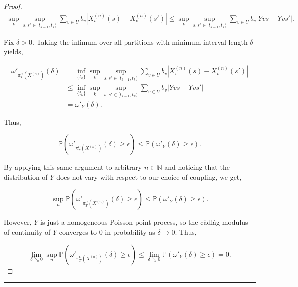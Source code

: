\documentclass[12pt]{article}
\newcommand{\mb}{\mathbb}
\newcommand{\ra}{\rightarrow}
\newcommand{\ep}{\epsilon}
\newcommand{\lin}{\rule{\linewidth}{0.4 pt}}
\newcommand{\pr}{\mb{P}}							%
\renewcommand{\v}{v}							%
\renewcommand{\U}{U}							%
\renewcommand{\b}{b}							%
\newcommand{\T}{T}								%
\renewcommand{\t}{t}							%
\newcommand{\proj}{\pi}							%
\renewcommand{\tt}{s}							%
\newcommand{\ttt}{s'}							%
\newcommand{\X}{X}								%
\newcommand{\vsi}[1]{^{#1}}						%
\newcommand{\cind}[1]{_{#1}}					%
\newcommand{\tp}[1]{(#1)}						%
\newcommand{\tip}[1]{#1}						%
\newcommand{\ts}[1]{_{#1}}						%
\newcommand{\sln}[1]{^{(#1)}}						%
\newcommand{\indx}[1]{_{#1}}					%
\newcommand{\XX}{Y}								%
\renewcommand{\it}{k}							%
\begin{document}
\begin{proof}
\begin{align*}
\sup_\it\sup_{\tt,\ttt \in [\t\indx{\it-1},\t\indx{\it})} \sum_{\v\in \U} \b\cind{\v}|\X\sln{n}\cind{\v}\tp{\tt} - \X\sln{n}\cind{\v}\tp{\ttt}|\leq \sup_\it\sup_{\tt,\ttt \in [\t\indx{\it-1},\t\indx{\it})} \sum_{\v\in \U} \b\cind{\v}|\XX{\v}{\tt} - \XX{\v}{\ttt}|.
\end{align*}

Fix \(\delta > 0\). Taking the infimum over all partitions with minimum interval length \(\delta\) yields,

\begin{align*}
\omega'_{\proj\vsi{\U}\ts{\T}\left(\X\sln{n}\cind{}\tip{}\right)}(\delta) &= \inf_{\{\t\indx{\it}\}}\sup_\it\sup_{\tt,\ttt \in [\t\indx{\it-1},\t\indx{\it})} \sum_{\v\in \U} \b\cind{\v}|\X\sln{n}\cind{\v}\tp{\tt} - \X\sln{n}\cind{\v}\tp{\ttt}|\\
&\leq \inf_{\{\t\indx{\it}\}}\sup_\it\sup_{\tt,\ttt \in [\t\indx{\it-1},\t\indx{\it})} \sum_{\v\in \U} \b\cind{\v}|\XX{\v}{\tt} - \XX{\v}{\ttt}|\\
&= \omega'_{\XX{}{}}(\delta).
\end{align*}

Thus,

\[\pr\left(\omega'_{\proj\vsi{\U}\ts{\T}\left(\X\sln{n}\cind{}\tip{}\right)}(\delta) \geq \ep\right) \leq \pr\left(\omega'_{\XX{}{}}(\delta) \geq \ep\right).\]

By applying this same argument to arbitrary \(n\in \mb{N}\) and noticing that the distribution of \(\XX{}{}\) does not vary with respect to our choice of coupling, we get,

\[\sup_{n}\pr\left(\omega'_{\proj\vsi{\U}\ts{\T}\left(\X\sln{n}\cind{}\tip{}\right)}(\delta)\geq \ep\right) \leq \pr\left(\omega'_{\XX{}{}}(\delta) \geq \ep\right).\]

However, \(\XX{}{}\) is just a homogeneous Poisson point process, so the c\`adl\`ag modulus of continuity of \(\XX{}{}\) converges to 0 in probability as \(\delta \ra 0\). Thus,

\[\lim_{\delta \searrow 0}\sup_{n}\pr\left(\omega'_{\proj\vsi{\U}\ts{\T}\left(\X\sln{n}\cind{}\tip{}\right)}(\delta) \geq \ep\right) \leq \lim_{\delta\searrow 0}\pr\left(\omega'_{\XX{}{}}(\delta)\geq \ep\right) = 0.\]


\end{proof}

\lin
\end{document}
